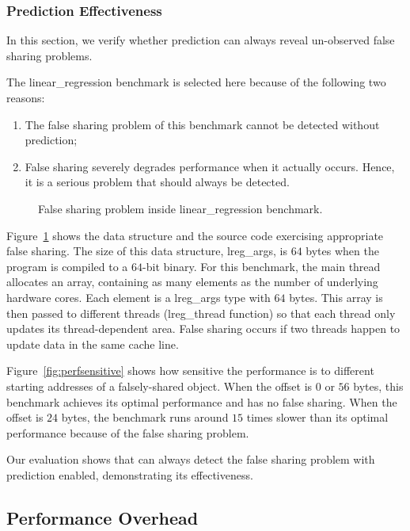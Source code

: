 \subsubsection{Prediction Effectiveness}
\label{sec:predicteval}
In this section, we verify whether prediction can always  reveal un-observed false sharing problems.

The linear\_regression benchmark is selected here because of the following two reasons:
\begin{enumerate}
\item
The false sharing problem of this benchmark cannot be detected without prediction; 
\item
False sharing severely degrades performance when it actually occurs. Hence, it is a serious problem that should always be detected. 
\end{enumerate}

\begin{figure}[!ht]
{\centering
\subfigure{}
\caption{False sharing problem inside linear\_regression benchmark.
\label{fig:linearregression}}
}
\end{figure}

Figure~\ref{fig:linearregression} shows the data structure and the source code exercising appropriate false sharing. The size of this data structure, lreg\_args, is $64$ bytes 
when the program is compiled to a $64$-bit binary. For this benchmark, the main thread allocates an array, containing as many elements as the number of underlying hardware cores. Each element is a lreg\_args type with $64$ bytes. This array is then passed to different threads (lreg\_thread function) so that each thread only updates its thread-dependent area. False sharing occurs if two threads happen to update data in the same cache line. 

Figure~\ref{fig:perfsensitive} shows how sensitive the performance is to different starting addresses of a falsely-shared object. When the offset is $0$ or $56$ bytes, this benchmark achieves its optimal performance and has no false sharing. When the offset is $24$ bytes, the benchmark runs around $15$ times slower than its optimal performance because of the false sharing problem.

Our evaluation shows that \Predator{} can always detect the false sharing problem with prediction enabled, demonstrating its effectiveness.

\subsection{Performance Overhead}
\label{sec:perfoverhead}

